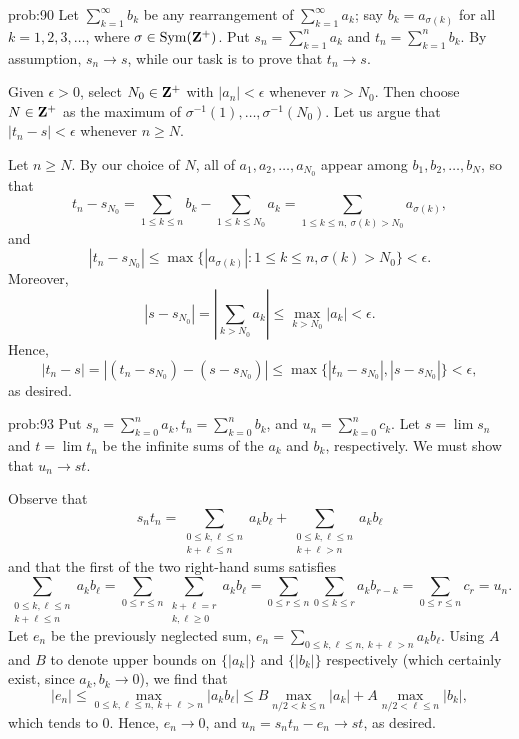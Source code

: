 \begin{sol}{prob:90} Let $\sum_{k=1}^{\infty} b_k$ be any rearrangement of $\sum_{k=1}^{\infty} a_k$; say $b_k = a_{\sigma(k)}$ for all $k=1,2,3,\dots$, where $\sigma \in \mathrm{Sym}(\mathbf{Z}^{+})$. Put $s_n = \sum_{k=1}^{n} a_k$ and $t_n = \sum_{k=1}^{n} b_k$. By assumption, $s_n \to s$, while our task is to prove that $t_n \to s$.

Given $\epsilon > 0$, select $N_0 \in \mathbf{Z}^{+}$ with $|a_n| < \epsilon$ whenever $n > N_0$. Then choose $N \in \mathbf{Z}^{+}$ as the maximum of $\sigma^{-1}(1),\dots,\sigma^{-1}(N_0)$. Let us argue that $|t_n-s| < \epsilon$ whenever $n\ge N$.


Let $n\ge N$. By our choice of $N$, all of $a_1,a_2,\dots,a_{N_0}$ appear among $b_{1},b_2,\dots,b_{N}$, so that 
\[ t_n - s_{N_0} = \sum_{1 \le k \le n} b_k- \sum_{1\le k \le N_0} a_k = \sum_{1 \le k \le n,~\sigma(k) > N_0} a_{\sigma(k)}, \] and
\[ |t_n-s_{N_0}| \le \max\{|a_{\sigma(k)}|: 1 \le k \le n, \sigma(k) > N_0\} < \epsilon. \]
Moreover, \[ |s-s_{N_0}| = \left|\sum_{k > N_0} a_k\right| \le \max_{k > N_0} |a_k| < \epsilon.\] Hence,
\[ |t_n - s| = |(t_n - s_{N_0}) - (s-s_{N_0})| \le \max\{|t_n - s_{N_0}|, |s-s_{N_0}|\} < \epsilon, \]
as desired.
\end{sol}

\begin{sol}{prob:93} Put $s_n= \sum_{k=0}^{n} a_k, t_n = \sum_{k=0}^{n} b_k$, and $u_n = \sum_{k=0}^{n} c_k$. Let $s = \lim s_n$ and $t=\lim t_n$ be the infinite sums of the $a_k$ and $b_k$, respectively. We must show that $u_n \to st$.

Observe that
\[ s_n t_n = \sum_{\substack{0 \le k,\ell \le n \\ k+\ell\le n}} a_k b_\ell + \sum_{\substack{0 \le k, \ell \le n \\ k+\ell > n}} a_k b_\ell 
\]
and that the first of the two right-hand sums satisfies
\[ \sum_{\substack{0 \le k,\ell \le n \\ k+\ell\le n}} a_k b_\ell = \sum_{0 \le r \le n} \sum_{\substack{k+\ell=r \\ k,\ell\ge 0}} a_k b_\ell =  \sum_{0 \le r \le n} \sum_{0 \le k \le r} a_k b_{r-k} = \sum_{0\le r \le n} c_r = u_n. \]
Let $e_n$ be the previously neglected sum, $e_n = \sum_{0 \le k,\ell \le n,~k+\ell>n} a_k b_\ell$. Using $A$ and $B$ to denote upper bounds on $\{|a_k|\}$ and $\{|b_k|\}$ respectively (which certainly exist, since $a_k, b_k \to 0$), we find that
\[ |e_n| \le \max_{0 \le k,\ell \le n, ~k+\ell > n} |a_k b_\ell| \le B\max_{n/2 < k \le n}|a_k|  + A\max_{n/2 < \ell \le n}|b_k|,\]
which tends to $0$. Hence, $e_n\to 0$, and $u_n = s_n t_n - e_n \to st$, as desired.
\end{sol}

